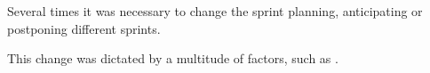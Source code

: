 Several times it was necessary to change the sprint planning, anticipating or postponing different sprints.

This change was dictated by a multitude of factors, such as .

